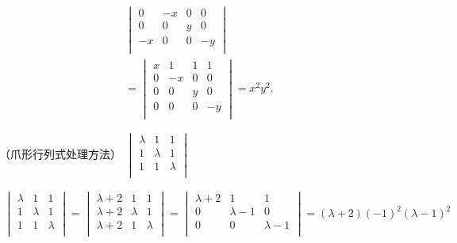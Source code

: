\begin{examp}
\begin{gather*}
\begin{vmatrix}
            0   &   -x   &   0   &   0   \\
            0   &   0   &   y   &   0   \\
            -x   &   0   &   0   &   -y   \\
        \end{vmatrix}\\
        =\begin{vmatrix}
            x   &   1   &   1   &   1   \\
            0   &   -x   &   0   &   0   \\
            0   &   0   &   y   &   0   \\
            0   &   0   &   0   &   -y   \\
        \end{vmatrix}=x^2y^2.
    \end{gather*}
\end{examp}
\begin{examp}{（爪形行列式处理方法）
    $\begin{vmatrix}
\lambda   &   1   &   1   \\
1   &   \lambda   &   1   \\
1   &   1   &   \lambda   \\
    \end{vmatrix}$}
    
    \jie 
    \begin{gather*}
        \begin{vmatrix}
            \lambda   &   1   &   1   \\
            1   &   \lambda   &   1   \\
            1   &   1   &   \lambda   \\
        \end{vmatrix}=
        \begin{vmatrix}
            \lambda+2   &   1   &   1   \\
            \lambda+2   &   \lambda   &   1   \\
            \lambda+2   &   1   &   \lambda   \\
        \end{vmatrix}= 
        \begin{vmatrix}
            \lambda+2   &   1   &   1   \\
            0   &   \lambda-1   &   0   \\
            0   &   0   &   \lambda-1   \\
        \end{vmatrix}=
        (\lambda+2)(-1)^2(\lambda-1)^2
    \end{gather*}
\end{examp}
